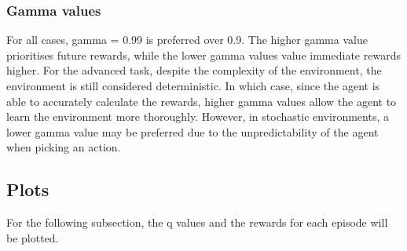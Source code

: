 \subsubsection{Gamma values}
For all cases, gamma = 0.99 is preferred over 0.9. The higher gamma value prioritises future rewards, while the lower gamma values value immediate rewards higher. For the advanced task, despite the complexity of the environment, the environment is still considered deterministic. In which case, since the agent is able to accurately calculate the rewards, higher gamma values allow the agent to learn the environment more thoroughly. However, in stochastic environments, a lower gamma value may be preferred due to the unpredictability of the agent when picking an action.

\subsection{Plots}
For the following subsection, the q values and the rewards for each episode will be plotted.